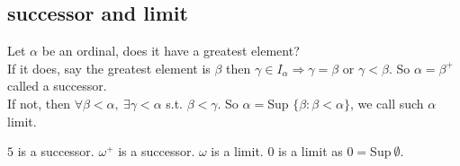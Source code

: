 \subsection{successor and limit}
Let $\alpha$ be an ordinal, does it have a greatest element?\\
If it does, say the greatest element is $\beta$ then $\gamma \in I_\alpha
\Rightarrow \gamma=\beta$ or $\gamma<\beta$. So $\alpha =\beta^+$
called a successor.\\
If not, then $\forall \beta < \alpha,~\exists \gamma < \alpha$ s.t.
$\beta < \gamma$. So $\alpha =$Sup $\{\beta: \beta < \alpha\}$,
we call such $\alpha$ limit.
\begin{example}
$5$ is a successor. $\omega^+$ is a successor. $\omega$ is a limit.
$0$ is a limit as $0=$Sup$~\emptyset$.
\end{example}
